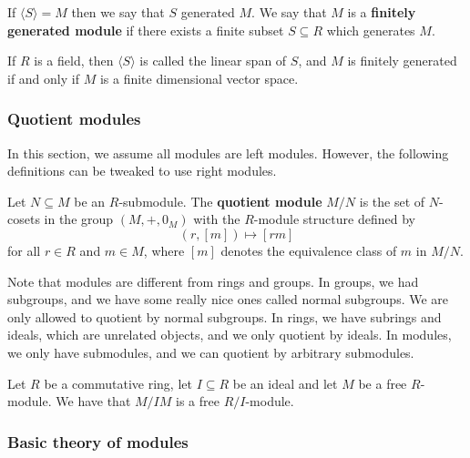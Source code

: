 \documentclass[12pt, a4paper]{article}
\begin{document}
\begin{definition}
    If \( \langle S \rangle = M \) then we say that \( S \) generated \( M \). We say that \( M \) is a \textbf{finitely generated module} if there exists a finite subset \( S \subseteq R \) which generates \( M \). 
\end{definition}

\begin{proposition}
    If \( R \) is a field, then \( \langle S \rangle \) is called the linear span of \( S \), and \(M\) is finitely generated if and only if \(M\) is a finite dimensional vector space.
\end{proposition}

\subsubsection{Quotient modules}

\begin{mdremark}
    In this section, we assume all modules are left modules. However, the following definitions can be tweaked to use right modules.
\end{mdremark}

\begin{definition}
    Let \(N \subseteq M\) be an \(R\)-submodule. The \textbf{quotient module} \(M/N\) is the set of \(N\)-cosets in the group \((M,+,0_M)\) with the \(R\)-module structure defined by 
    \[(r,[m]) \mapsto [rm]\]
    for all \(r \in R\) and \(m\in M\), where \([m]\) denotes the equivalence class of \(m\) in \(M/N\).
\end{definition}

\begin{mdremark}
    Note that modules are different from rings and groups. In groups, we had subgroups, and we have some really nice ones called normal subgroups. We are only allowed to quotient by normal subgroups. In rings, we have subrings and ideals, which are unrelated objects, and we only quotient by ideals. In modules, we only have submodules, and we can quotient by arbitrary submodules.
\end{mdremark}

\begin{mdprop}
    Let \(R\) be a commutative ring, let \(I\subseteq R\) be an ideal and let \(M\) be a free \(R\)-module. We have that \(M/IM\) is a free \(R/I\)-module.
\end{mdprop}

\subsubsection{Basic theory of modules}
\end{document}

